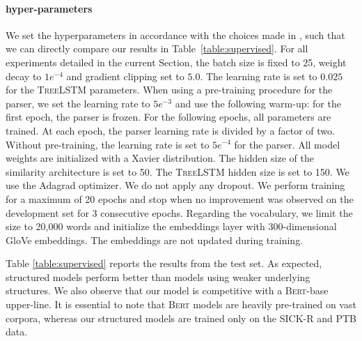 \paragraph{hyper-parameters} We set the hyperparameters in accordance with the choices made in \textcite{tai_15}, such that we can directly compare our results in Table~\ref{table:supervised}. For all experiments detailed in the current Section, the batch size is fixed to 25, weight decay to $1e^{-4}$ and gradient clipping set to $5.0$. The learning rate is set to $0.025$ for the \textsc{TreeLSTM} parameters. When using a pre-training procedure for the parser, we set the learning rate to $5e^{-3}$ and use the following warm-up: for the first epoch, the parser is frozen. For the following epochs, all parameters are trained. At each epoch, the parser learning rate is divided by a factor of two. Without pre-training, the learning rate is set to $5e^{-4}$ for the parser. All model weights are initialized with a Xavier distribution. The hidden size of the similarity architecture is set to 50. The \textsc{TreeLSTM} hidden size is set to 150. We use the Adagrad optimizer. We do not apply any dropout. We perform training for a maximum of 20 epochs and stop when no improvement was observed on the development set for 3 consecutive epochs.
Regarding the vocabulary, we limit the size to 20,000 words and initialize the embeddings layer with 300-dimensional GloVe embeddings. The embeddings are not updated during training.



Table \ref{table:supervised} reports the results from the test set. As expected, structured models perform better than models using weaker underlying structures. We also observe that our model is competitive with a \textsc{Bert}-base upper-line. It is essential to note that \textsc{Bert} models are heavily pre-trained on vast corpora, whereas our structured models are trained only on the SICK-R and PTB data. 

